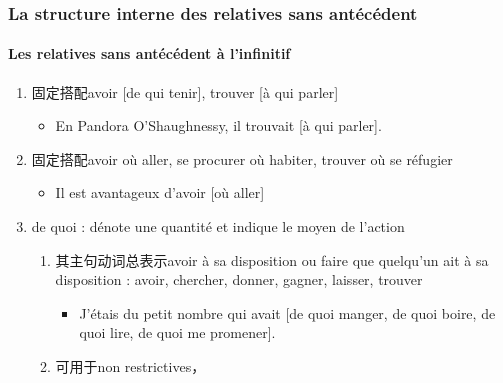 \documentclass[UTF8]{report}
\begin{document}
\subsubsection{La structure interne des relatives sans antécédent}
\paragraph{Les relatives sans antécédent à l’infinitif}
\begin{enumerate}
    \item 固定搭配avoir [de qui tenir], trouver [à qui parler]
    \begin{itemize}
        \item En Pandora O’Shaughnessy, il trouvait [à qui parler].
    \end{itemize}
    \item 固定搭配avoir où aller, se procurer où habiter, trouver où se réfugier
    \begin{itemize}
        \item Il est avantageux d’avoir [où aller] 
    \end{itemize}
    \item de quoi : dénote une quantité et indique le moyen de l’action
    \begin{enumerate}
        \item 其主句动词总表示avoir à sa disposition ou faire que quelqu’un ait à sa disposition : avoir, chercher, donner, gagner, laisser, trouver
        \begin{itemize}
            \item J’étais du petit nombre qui avait [de quoi manger, de quoi boire, de quoi lire, de quoi me promener].
        \end{itemize}
        \item 可用于non restrictives，
    \end{enumerate}
\end{enumerate}
\end{document}
